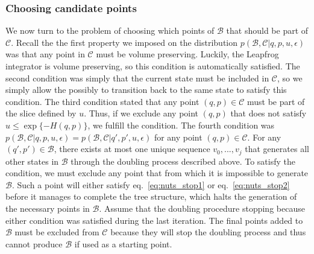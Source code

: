\subsubsection{Choosing candidate points}
We now turn to the problem of choosing which points of $\mathcal{B}$ that should be part of $\mathcal{C}$.
Recall the the first property we imposed on the distribution $p(\mathcal{B}, \mathcal{C}|q, p, u, \epsilon)$ was that
any point in $\mathcal{C}$ must be volume preserving. Luckily, the Leapfrog integrator is volume preserving, so this condition is
automatically satisfied. The second condition was simply that the current state must be included in $\mathcal{C}$, so we simply
allow the possibly to transition back to the same state to satisfy this condition. The third condition stated
that any point $(q, p) \in \mathcal{C}$ must be part of the slice defined by $u$. Thus, if we exclude any point $(q,p)$
that does not satisfy $u \leq \exp\{-H(q, p)\}$, we fulfill the condition.
The fourth condition was $p(\mathcal{B}, \mathcal{C}|q, p, u, \epsilon) = p(\mathcal{B}, \mathcal{C}|q', p', u, \epsilon)$
for any point $(q, p) \in \mathcal{C}$. 
For any $(q', p') \in \mathcal{B}$, there exists at most one unique sequence $v_0, ..., v_j$ that generates all other
states in $\mathcal{B}$ through the doubling process described above. To satisfy the condition, we must exclude any point
that from which it is impossible to generate $\mathcal{B}$. 
Such a point will either satisfy eq.~\eqref{eq:nuts_stop1} or eq.~\eqref{eq:nuts_stop2}
before it manages to complete the tree structure, which halts the generation of the necessary points in $\mathcal{B}$. 
Assume that the doubling procedure stopping because either condition was satisfied during the last iteration. 
The final points added to $\mathcal{B}$ must be excluded from $\mathcal{C}$ because they will stop the doubling process and
thus cannot produce $\mathcal{B}$ if used as a starting point. 






